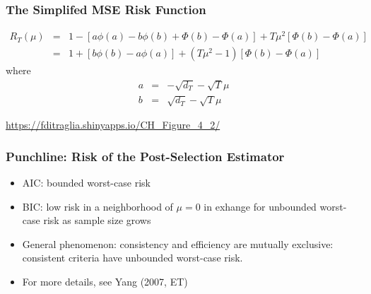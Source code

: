 \begin{frame}
  \frametitle{The Simplifed MSE Risk Function}
	\begin{eqnarray*}
		R_T(\mu) &=& 1 - \left[a\phi(a) - b\phi(b) + \Phi(b) - \Phi(a) \right] + T\mu^2 \left[\Phi(b) - \Phi(a) \right]\\
		&=&1 + \left[b\phi(b) - a\phi(a)\right]  + (T\mu^2 - 1) \left[\Phi(b) - \Phi(a) \right] 
	\end{eqnarray*}
where
	\begin{eqnarray*}
		a &=& -\sqrt{d_T} - \sqrt{T}\mu\\
		b &=& \sqrt{d_T} - \sqrt{T}\mu
	\end{eqnarray*}

\url{https://fditraglia.shinyapps.io/CH\_Figure\_4\_2/}
\end{frame}
\begin{frame}
  \frametitle{Punchline: Risk of the Post-Selection Estimator}

  \begin{itemize}
    \item AIC: bounded worst-case risk
    \item BIC: low risk in a neighborhood of $\mu=0$ in exhange for \alert{unbounded} worst-case risk as sample size grows
    \item General phenomenon: consistency and efficiency are mutually exclusive: consistent criteria have unbounded worst-case risk.
    \item For more details, see Yang (2007, ET)
  \end{itemize}

\end{frame}

